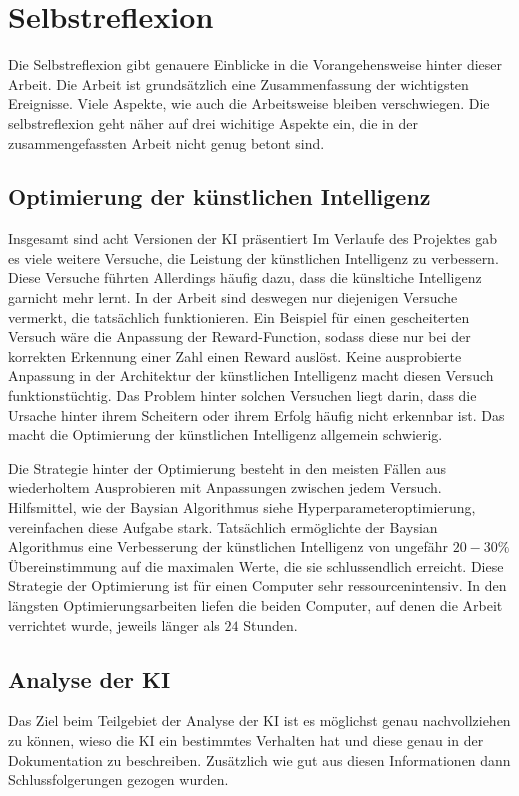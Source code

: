 \section{Selbstreflexion}
Die Selbstreflexion gibt genauere Einblicke in die Vorangehensweise hinter
dieser Arbeit. Die Arbeit ist grundsätzlich eine Zusammenfassung der wichtigsten
Ereignisse. Viele Aspekte, wie auch die Arbeitsweise bleiben verschwiegen. Die
selbstreflexion geht näher auf drei wichitige Aspekte ein, die in der
zusammengefassten Arbeit nicht genug betont sind.

\subsection*{Optimierung der künstlichen Intelligenz}

Insgesamt sind acht Versionen der KI präsentiert Im Verlaufe des Projektes gab
es viele weitere Versuche, die Leistung der künstlichen Intelligenz zu
verbessern. Diese Versuche führten Allerdings häufig dazu, dass die künsltiche
Intelligenz garnicht mehr lernt. In der Arbeit sind deswegen nur diejenigen
Versuche vermerkt, die tatsächlich funktionieren. Ein Beispiel für einen
gescheiterten Versuch wäre die Anpassung der Reward-Function, sodass diese nur
bei der korrekten Erkennung einer Zahl einen Reward auslöst. Keine
ausprobierte Anpassung in der Architektur der künstlichen Intelligenz macht
diesen Versuch funktionstüchtig. Das Problem hinter solchen Versuchen liegt
darin, dass die Ursache hinter ihrem Scheitern oder ihrem Erfolg häufig nicht
erkennbar ist. Das macht die Optimierung der künstlichen Intelligenz allgemein
schwierig. 

Die Strategie hinter der Optimierung besteht in den meisten Fällen aus
wiederholtem Ausprobieren mit Anpassungen zwischen jedem Versuch. Hilfsmittel,
wie der Baysian Algorithmus {siehe Hyperparameteroptimierung}, vereinfachen
diese Aufgabe stark. Tatsächlich ermöglichte der Baysian Algorithmus eine
Verbesserung der künstlichen Intelligenz von ungefähr $20-30\%$ Übereinstimmung
auf die maximalen Werte, die sie schlussendlich erreicht. Diese Strategie der
Optimierung ist für einen Computer sehr ressourcenintensiv. In den längsten
Optimierungsarbeiten liefen die beiden Computer, auf denen die Arbeit
verrichtet wurde, jeweils länger als $24$ Stunden.



\subsection*{Analyse der KI}
Das Ziel beim Teilgebiet der Analyse der KI ist es möglichst genau
nachvollziehen zu können, wieso die KI ein bestimmtes Verhalten hat und diese
genau in der Dokumentation zu beschreiben. Zusätzlich wie gut aus diesen
Informationen dann Schlussfolgerungen gezogen wurden.

